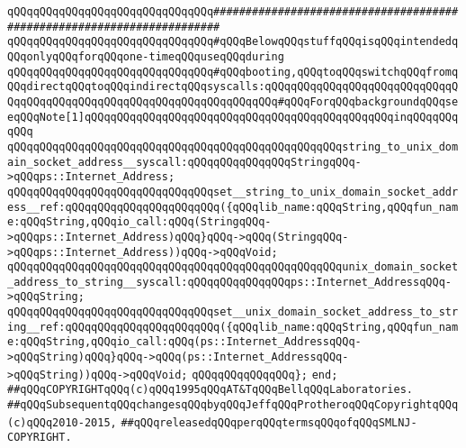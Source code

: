 \newline
\newline
\newline
\verb|qQQqqQQqqQQqqQQqqQQqqQQqqQQqqQQq#######################################################################|\newline
\verb|qQQqqQQqqQQqqQQqqQQqqQQqqQQqqQQq#qQQqBelowqQQqstuffqQQqisqQQqintendedqQQqonlyqQQqforqQQqone-timeqQQquseqQQqduring|\newline
\verb|qQQqqQQqqQQqqQQqqQQqqQQqqQQqqQQq#qQQqbooting,qQQqtoqQQqswitchqQQqfromqQQqdirectqQQqtoqQQqindirectqQQqsyscalls:qQQqqQQqqQQqqQQqqQQqqQQqqQQqqQQqqQQqqQQqqQQqqQQqqQQqqQQqqQQqqQQqqQQqqQQq#qQQqForqQQqbackgroundqQQqseeqQQqNote[1]qQQqqQQqqQQqqQQqqQQqqQQqqQQqqQQqqQQqqQQqqQQqqQQqinqQQqqQQqqQQq|\newline
\newline
\verb|qQQqqQQqqQQqqQQqqQQqqQQqqQQqqQQqqQQqqQQqqQQqqQQqqQQqstring_to_unix_domain_socket_address__syscall:qQQqqQQqqQQqqQQqStringqQQq->qQQqps::Internet_Address;|\newline
\verb|qQQqqQQqqQQqqQQqqQQqqQQqqQQqqQQqset__string_to_unix_domain_socket_address__ref:qQQqqQQqqQQqqQQqqQQqqQQq({qQQqlib_name:qQQqString,qQQqfun_name:qQQqString,qQQqio_call:qQQq(StringqQQq->qQQqps::Internet_Address)qQQq}qQQq->qQQq(StringqQQq->qQQqps::Internet_Address))qQQq->qQQqVoid;|\newline
\newline
\verb|qQQqqQQqqQQqqQQqqQQqqQQqqQQqqQQqqQQqqQQqqQQqqQQqqQQqunix_domain_socket_address_to_string__syscall:qQQqqQQqqQQqqQQqps::Internet_AddressqQQq->qQQqString;|\newline
\verb|qQQqqQQqqQQqqQQqqQQqqQQqqQQqqQQqset__unix_domain_socket_address_to_string__ref:qQQqqQQqqQQqqQQqqQQqqQQq({qQQqlib_name:qQQqString,qQQqfun_name:qQQqString,qQQqio_call:qQQq(ps::Internet_AddressqQQq->qQQqString)qQQq}qQQq->qQQq(ps::Internet_AddressqQQq->qQQqString))qQQq->qQQqVoid;|\newline
\verb|qQQqqQQqqQQqqQQq};|\newline
\verb|end;|\newline
\newline
\newline
\newline
\verb|##qQQqCOPYRIGHTqQQq(c)qQQq1995qQQqAT&TqQQqBellqQQqLaboratories.|\newline
\verb|##qQQqSubsequentqQQqchangesqQQqbyqQQqJeffqQQqProtheroqQQqCopyrightqQQq(c)qQQq2010-2015,|\newline
\verb|##qQQqreleasedqQQqperqQQqtermsqQQqofqQQqSMLNJ-COPYRIGHT.|\newline


